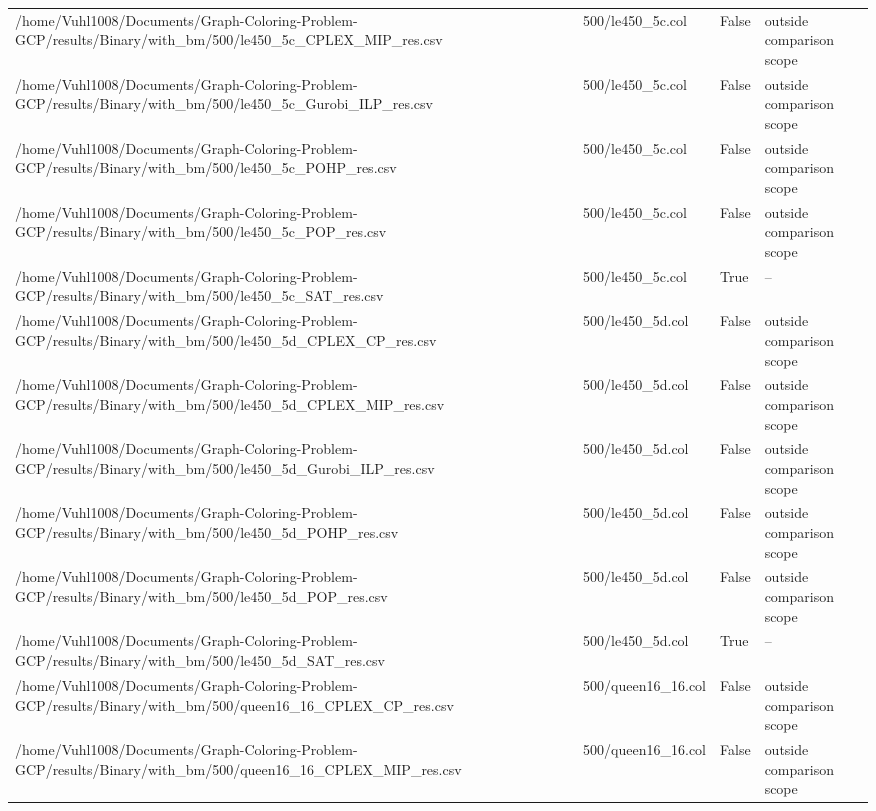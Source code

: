 \begin{table}[htbp]
\begin{tabular}{llll}
/home/Vuhl1008/Documents/Graph-Coloring-Problem-GCP/results/Binary/with\_bm/500/le450\_5c\_CPLEX\_MIP\_res.csv & 500/le450\_5c.col & False & outside comparison scope \\
/home/Vuhl1008/Documents/Graph-Coloring-Problem-GCP/results/Binary/with\_bm/500/le450\_5c\_Gurobi\_ILP\_res.csv & 500/le450\_5c.col & False & outside comparison scope \\
/home/Vuhl1008/Documents/Graph-Coloring-Problem-GCP/results/Binary/with\_bm/500/le450\_5c\_POHP\_res.csv & 500/le450\_5c.col & False & outside comparison scope \\
/home/Vuhl1008/Documents/Graph-Coloring-Problem-GCP/results/Binary/with\_bm/500/le450\_5c\_POP\_res.csv & 500/le450\_5c.col & False & outside comparison scope \\
/home/Vuhl1008/Documents/Graph-Coloring-Problem-GCP/results/Binary/with\_bm/500/le450\_5c\_SAT\_res.csv & 500/le450\_5c.col & True & -- \\
/home/Vuhl1008/Documents/Graph-Coloring-Problem-GCP/results/Binary/with\_bm/500/le450\_5d\_CPLEX\_CP\_res.csv & 500/le450\_5d.col & False & outside comparison scope \\
/home/Vuhl1008/Documents/Graph-Coloring-Problem-GCP/results/Binary/with\_bm/500/le450\_5d\_CPLEX\_MIP\_res.csv & 500/le450\_5d.col & False & outside comparison scope \\
/home/Vuhl1008/Documents/Graph-Coloring-Problem-GCP/results/Binary/with\_bm/500/le450\_5d\_Gurobi\_ILP\_res.csv & 500/le450\_5d.col & False & outside comparison scope \\
/home/Vuhl1008/Documents/Graph-Coloring-Problem-GCP/results/Binary/with\_bm/500/le450\_5d\_POHP\_res.csv & 500/le450\_5d.col & False & outside comparison scope \\
/home/Vuhl1008/Documents/Graph-Coloring-Problem-GCP/results/Binary/with\_bm/500/le450\_5d\_POP\_res.csv & 500/le450\_5d.col & False & outside comparison scope \\
/home/Vuhl1008/Documents/Graph-Coloring-Problem-GCP/results/Binary/with\_bm/500/le450\_5d\_SAT\_res.csv & 500/le450\_5d.col & True & -- \\
/home/Vuhl1008/Documents/Graph-Coloring-Problem-GCP/results/Binary/with\_bm/500/queen16\_16\_CPLEX\_CP\_res.csv & 500/queen16\_16.col & False & outside comparison scope \\
/home/Vuhl1008/Documents/Graph-Coloring-Problem-GCP/results/Binary/with\_bm/500/queen16\_16\_CPLEX\_MIP\_res.csv & 500/queen16\_16.col & False & outside comparison scope \\

\end{tabular}
\end{table}
